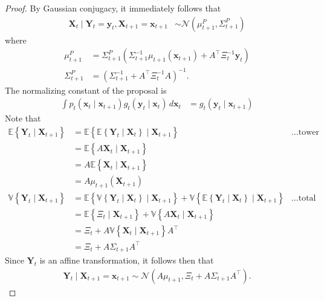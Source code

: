 \begin{proof}
    By Gaussian conjugacy, it immediately follows that
    \begin{align*}
        \mathbf{X}_{t} \mid \mathbf{Y}_{t} = \mathbf{y}_{t}, \mathbf{X}_{t+1} = \mathbf{x}_{t+1} &\sim \mathcal{N}\left( \mu_{t+1}^P, \Sigma_{t+1}^P \right) 
    \end{align*}
    where
    \begin{align*}
        \mu_{t+1}^P &= \Sigma_{t+1}^P\left( \Sigma_{t+1}^{-1}\mu_{t+1}(\mathbf{x}_{t+1}) + A^\top\Xi_{t}^{-1}\mathbf{y}_{t} \right) \\
        \Sigma_{t+1}^P &= \left( \Sigma_{t+1}^{-1} + A^\top \Xi_{t}^{-1}A \right)^{-1}.
    \end{align*}
    The normalizing constant of the proposal is
    \begin{align*}
        \int p_{t}(\mathbf{x}_{t} \mid \mathbf{x}_{t+1})g_{t}(\mathbf{y}_{t} \mid \mathbf{x}_{t}) \, d\mathbf{x}_{t} &= g_{t}(\mathbf{y}_{t} \mid \mathbf{x}_{t+1})
    \end{align*}
    Note that
    \begin{align*}
        \mathbb{E}\left\{ \mathbf{Y}_{t} \mid \mathbf{X}_{t+1} \right\} &= \mathbb{E}\left\{\mathbb{E}\left\{\mathbf{Y}_{t} \mid \mathbf{X}_{t}\right\} \mid \mathbf{X}_{t+1}\right\} &\dots\text{tower property} \\
        &= \mathbb{E}\left\{A\mathbf{X}_{t} \mid \mathbf{X}_{t+1}\right\} \\
        &= A\mathbb{E}\left\{\mathbf{X}_{t} \mid \mathbf{X}_{t+1}\right\} \\
        &= A\mu_{t+1}(\mathbf{X}_{t+1}) \\
        \mathbb{V}\left\{\mathbf{Y}_{t} \mid \mathbf{X}_{t+1}\right\} &= \mathbb{E}\left\{\mathbb{V}\left\{\mathbf{Y}_{t} \mid \mathbf{X}_{t}\right\} \mid \mathbf{X}_{t+1}\right\} + \mathbb{V}\left\{\mathbb{E}\left\{\mathbf{Y}_{t} \mid \mathbf{X}_{t}\right\} \mid \mathbf{X}_{t+1}\right\} &\dots \text{total variance} \\
        &= \mathbb{E}\left\{\Xi_{t} \mid \mathbf{X}_{t+1}\right\} + \mathbb{V}\left\{A\mathbf{X}_{t} \mid \mathbf{X}_{t+1}\right\} \\
        &= \Xi_{t} + A\mathbb{V}\left\{\mathbf{X}_{t} \mid \mathbf{X}_{t+1}\right\}A^{\top} \\
        &= \Xi_{t} + A\Sigma_{t+1}A^{\top}
    \end{align*}
    Since $\mathbf{Y}_{t}$ is an affine transformation, it follows then that
    \begin{align*}
        \mathbf{Y}_{t} \mid \mathbf{X}_{t+1} = \mathbf{x}_{t+1} \sim \mathcal{N}\left( A\mu_{t+1}, \Xi_{t} + A\Sigma_{t+1}A^\top \right).
    \end{align*}
\end{proof}

